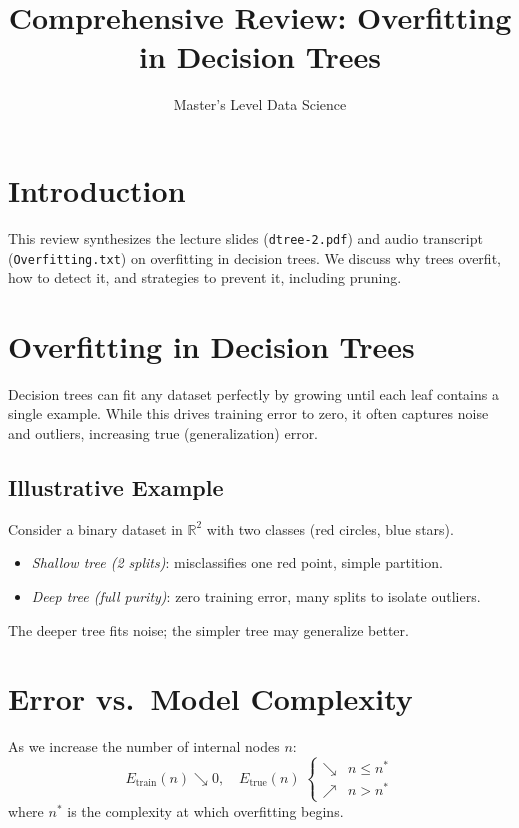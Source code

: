 \documentclass[11pt]{article}
\title{Comprehensive Review: Overfitting in Decision Trees}
\author{Master’s Level Data Science}
\date{}
\begin{document}
\maketitle
\tableofcontents
\bigskip

\section{Introduction}
This review synthesizes the lecture slides (\texttt{dtree-2.pdf}) and audio transcript (\texttt{Overfitting.txt}) on overfitting in decision trees. We discuss why trees overfit, how to detect it, and strategies to prevent it, including pruning.

\section{Overfitting in Decision Trees}
Decision trees can fit any dataset perfectly by growing until each leaf contains a single example. While this drives training error to zero, it often captures noise and outliers, increasing true (generalization) error.

\subsection{Illustrative Example}
Consider a binary dataset in $\mathbb{R}^2$ with two classes (red circles, blue stars).  
\begin{itemize}
  \item \emph{Shallow tree (2 splits)}: misclassifies one red point, simple partition.
  \item \emph{Deep tree (full purity)}: zero training error, many splits to isolate outliers.
\end{itemize}
The deeper tree fits noise; the simpler tree may generalize better.

\section{Error vs.\ Model Complexity}
As we increase the number of internal nodes $n$:  
\[
  E_{\mathrm{train}}(n)\searrow 0,\quad
  E_{\mathrm{true}}(n)\;\begin{cases}
    \searrow & n\le n^*\\
    \nearrow & n>n^*
  \end{cases}
\]
where $n^*$ is the complexity at which overfitting begins.
\end{document}
